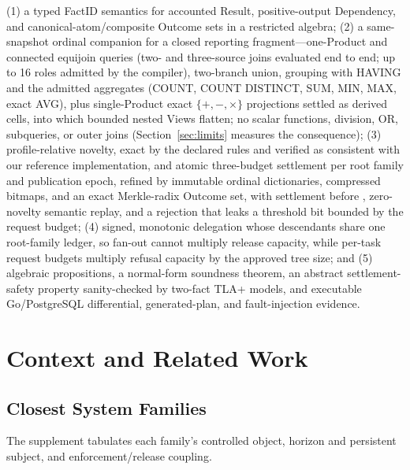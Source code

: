 \documentclass[10pt,journal,compsoc]{IEEEtran}
\newcommand{\code}[1]{\texttt{\detokenize{#1}}}
\begin{document}
(1) a typed FactID semantics for accounted Result, positive-output
Dependency, and canonical-atom/composite Outcome sets in a restricted
algebra; (2) a same-snapshot ordinal companion for a closed reporting
fragment---one-Product and connected equijoin queries (two- and
three-source joins evaluated end to end; up to 16 roles admitted by the
compiler), two-branch
union, grouping with HAVING and the admitted aggregates (COUNT, COUNT
DISTINCT, SUM, MIN, MAX, exact AVG), plus single-Product exact
$\{+,-,\times\}$ projections settled as derived cells, into which bounded
nested Views flatten; no scalar functions, division, OR, subqueries, or outer joins
(Section~\ref{sec:limits} measures the consequence); (3)
profile-relative novelty, exact by the declared rules and verified as
consistent with our reference implementation, and
atomic three-budget settlement per root family and publication epoch,
refined by immutable ordinal dictionaries, compressed bitmaps, and an exact
Merkle-radix Outcome set, with settlement before \code{AVAILABLE},
zero-novelty semantic replay, and a rejection that leaks a threshold bit
bounded by the request budget; (4) signed, monotonic delegation whose
descendants share one root-family ledger, so fan-out cannot multiply
release capacity, while per-task request budgets multiply refusal capacity
by the approved tree size; and (5) algebraic
propositions, a normal-form soundness theorem, an abstract settlement-safety
property sanity-checked by two-fact TLA+ models, and executable
Go/PostgreSQL differential, generated-plan, and fault-injection evidence.

\section{Context and Related Work}
\label{sec:related}

\subsection{Closest System Families}

The supplement tabulates each family's controlled object, horizon and
persistent subject, and enforcement/release coupling.
\end{document}
